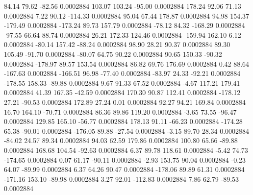        84.14       79.62      -82.56     0.0002884
      103.07      103.24      -95.00     0.0002884
      178.24       92.06       71.13     0.0002884
        7.22       90.12     -114.33     0.0002884
       95.04       67.44      178.87     0.0002884
       94.98      154.37     -179.49     0.0002884
     -173.24       89.73      157.79     0.0002884
      -78.12       84.32     -168.29     0.0002884
      -97.55       66.64       88.74     0.0002884
       26.21      172.33      124.46     0.0002884
     -159.94      162.10        6.12     0.0002884
      -80.14      157.42      -88.24     0.0002884
       98.90       28.21       90.37     0.0002884
       89.30      105.49      -91.70     0.0002884
      -80.07       64.75       90.22     0.0002884
       90.65      150.33      -90.32     0.0002884
     -178.97       89.57      153.54     0.0002884
       86.82       69.76      176.69     0.0002884
        0.42       88.64     -167.63     0.0002884
     -166.51       96.98      -77.40     0.0002884
      -83.97       24.33      -92.21     0.0002884
     -178.55      158.33      -89.88     0.0002884
        9.67       91.33       67.52     0.0002884
       -4.67      117.21      179.41     0.0002884
       41.39      167.35      -42.59     0.0002884
      170.30       90.87      112.41     0.0002884
     -178.12       27.21      -90.53     0.0002884
      172.89       27.24        0.01     0.0002884
       92.27       94.21      169.84     0.0002884
       16.70      164.10      -70.71     0.0002884
       86.36       89.86      119.20     0.0002884
       -3.65       73.55      -96.47     0.0002884
      129.85      165.10      -56.77     0.0002884
      178.13       91.11      -66.23     0.0002884
     -174.28       65.38      -90.01     0.0002884
     -176.05       89.88      -27.54     0.0002884
       -3.15       89.70       28.34     0.0002884
      -84.02       24.57       89.34     0.0002884
       94.03       62.59      179.86     0.0002884
      100.80       65.66      -89.88     0.0002884
      168.68      104.54      -92.63     0.0002884
        6.37       89.78      118.61     0.0002884
       -5.42       74.73     -174.65     0.0002884
        0.07       61.17      -90.11     0.0002884
       -2.93      153.75       90.04     0.0002884
       -0.23       64.07      -89.99     0.0002884
        6.37       64.26       90.47     0.0002884
     -178.06       89.89       61.31     0.0002884
     -171.16      153.10      -89.98     0.0002884
        3.27       92.01     -112.83     0.0002884
        7.86       62.79      -89.53     0.0002884
